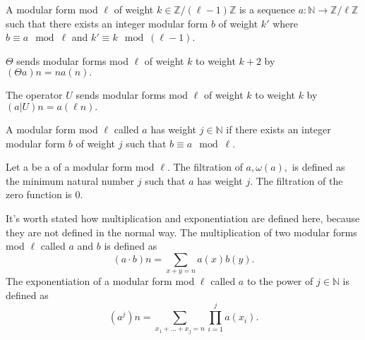 \begin{definition} 
  \label{def:ModularFormMod}
  \leanok
  A modular form mod $\ell$ of weight $k \in \mathbb{Z} / (\ell - 1) \mathbb{Z}$ is a sequence $a : \mathbb{N} → \mathbb{Z} / \ell \mathbb{Z}$
  such that there exists an integer modular form $b$ of weight $k'$ where
  $b \equiv a \mod \ell$ and $k' \equiv k \mod (\ell - 1)$.
\end{definition}


\begin{definition} [Theta]
  \label{def:Theta}
  \leanok
  $\Theta$ sends modular forms mod $\ell$ of weight $k$ to weight $k + 2$ by \\
  $(\Theta a) n = n a(n).$

\end{definition}

\begin{definition} [U Operator]
  \label{def:U_Operator}
  \leanok
  The operator $U$ sends modular forms mod $\ell$ of weight $k$ to weight $k$ by \\
  $ (a|U) n = a(\ell n).$
\end{definition}

\begin{definition} [hasWeight]
  \label{def:hasWeight}
  \leanok
  A modular form mod $\ell$ called $a$ has weight $j \in \mathbb{N}$ if
  there exists an integer modular form $b$ of weight $j$ such that $b \equiv a \mod \ell$.
\end{definition}

\begin{definition} [Filtration]
  \label{def:Filtration}
  \leanok
  Let a be a of a modular form mod $\ell$. The filtration of $a, \omega (a), $ 
  is defined as the minimum natural number $j$ such that $a$ has weight $j$. 
  The filtration of the zero function is $0$.
\end{definition}

\begin{definition} 
  \label{def:mulpow}
  \leanok
  It's worth stated how multiplication and exponentiation are defined here, because they are not defined in the normal way.
  The multiplication of two modular forms mod $\ell$ called $a$ and $b$ is defined as 
  \[(a \cdot b) n = \sum_{x + y = n} a(x) b(y).\] 
  The exponentiation of a modular form mod $\ell$ called $a$ to the power of $j \in \mathbb{N}$ is defined as 
  \[(a^j) n = \sum_ {x_1 + ... + x_j = n} \prod_{i = 1}^j a (x_i).\]
\end{definition}



